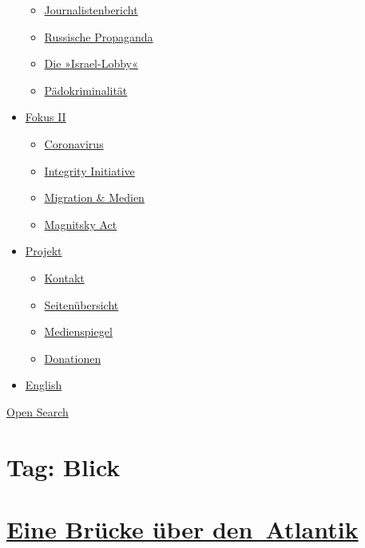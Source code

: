 \begin{itemize}
  \begin{itemize}
  \tightlist
  \item
    \href{https://swprs.org/bericht-eines-journalisten/}{Journalistenbericht}
  \item
    \href{https://swprs.org/russische-propaganda/}{Russische Propaganda}
  \item
    \href{https://swprs.org/die-israel-lobby-fakten-und-mythen/}{Die
    »Israel-Lobby«}
  \item
    \href{https://swprs.org/geopolitik-und-paedokriminalitaet/}{Pädokriminalität}
  \end{itemize}
\item
  \href{https://swprs.org/migration-und-medien/}{Fokus II}

  \begin{itemize}
  \tightlist
  \item
    \href{https://swprs.org/covid-19-hinweis-ii/}{Coronavirus}
  \item
    \href{https://swprs.org/die-integrity-initiative/}{Integrity
    Initiative}
  \item
    \href{https://swprs.org/migration-und-medien/}{Migration \& Medien}
  \item
    \href{https://swprs.org/der-fall-magnitsky/}{Magnitsky Act}
  \end{itemize}
\item
  \href{https://swprs.org/kontakt/}{Projekt}

  \begin{itemize}
  \tightlist
  \item
    \href{https://swprs.org/kontakt/}{Kontakt}
  \item
    \href{https://swprs.org/uebersicht/}{Seitenübersicht}
  \item
    \href{https://swprs.org/medienspiegel/}{Medienspiegel}
  \item
    \href{https://swprs.org/donationen/}{Donationen}
  \end{itemize}
\item
  \href{https://swprs.org/contact/}{English}
\end{itemize}

\protect\hyperlink{}{Open Search}

\hypertarget{tag-blick}{%
\section{Tag: Blick}\label{tag-blick}}

\hypertarget{eine-bruxfccke-uxfcber-den-atlantik}{%
\section{\texorpdfstring{\href{https://swprs.org/2017/03/01/eine-bruecke-ueber-den-atlantik/}{Eine
Brücke über
den~Atlantik}}{Eine Brücke über den~Atlantik}}\label{eine-bruxfccke-uxfcber-den-atlantik}}

